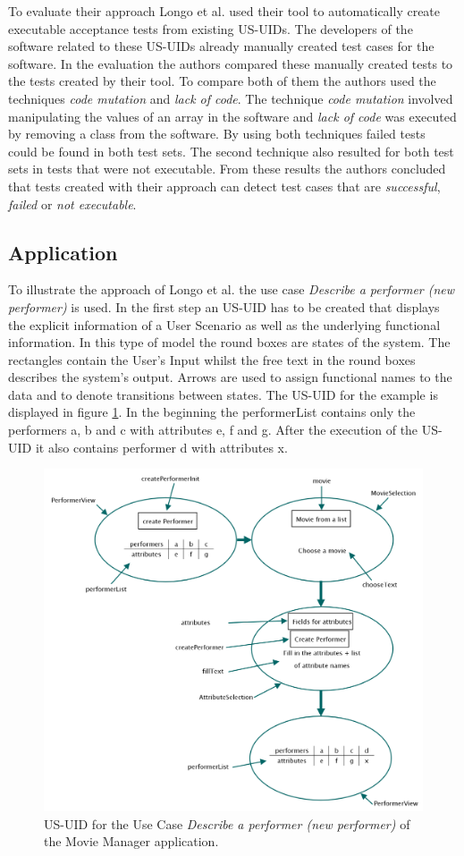 To evaluate their approach Longo et al. used their tool to automatically create executable acceptance tests from existing US-UIDs.
The developers of the software related to these US-UIDs already manually created test cases for the software.
In the evaluation the authors compared these manually created tests to the tests created by their tool.
To compare both of them the authors used the techniques \textit{code mutation} and \textit{lack of code}.
The technique \textit{code mutation} involved manipulating the values of an array in the software and \textit{lack of code} was executed by removing a class from the software.
By using both techniques failed tests could be found in both test sets.
The second technique also resulted for both test sets in tests that were not executable.
From these results the authors concluded that tests created with their approach can detect test cases that are \textit{successful}, \textit{failed} or \textit{not executable}.

\subsection{Application}

To illustrate the approach of Longo et al. the use case \textit{Describe a performer (new performer)} is used.
In the first step an US-UID has to be created that displays the explicit information of a User Scenario as well as the underlying functional information.
In this type of model the round boxes are states of the system.
The rectangles contain the User's Input whilst the free text in the round boxes describes the system's output.
Arrows are used to assign functional names to the data and to denote transitions between states.
The US-UID for the example is displayed in figure \ref{fig:us-uid-mm}.
In the beginning the performerList contains only the performers a, b and c with attributes e, f and g.
After the execution of the US-UID it also contains performer d with attributes x.


\begin{figure}[tbh]
	\centering
	\includegraphics[width=.85\textwidth]{../images/US-UID.png}
	\caption{US-UID for the Use Case \textit{Describe a performer (new performer)} of the Movie Manager application.}
	\label{fig:us-uid-mm}
\end{figure}

